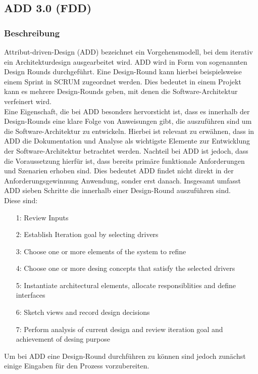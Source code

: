 \subsection{ADD 3.0 (FDD)}
\subsubsection{Beschreibung}
Attribut-driven-Design (ADD) bezeichnet ein Vorgehensmodell, bei dem iterativ ein Architekturdesign ausgearbeitet wird. ADD wird in Form von sogenannten Design Rounds durchgeführt. Eine Design-Round kann hierbei beispielsweise einem Sprint in SCRUM zugeordnet werden. Dies bedeutet in einem Projekt kann es mehrere Design-Rounds geben, mit denen die Software-Architektur verfeinert wird. \\

Eine Eigenschaft, die bei ADD besonders hervorsticht ist, dass es innerhalb der Design-Rounds eine klare Folge von Anweisungen gibt, die auszuführen sind um die Software-Architektur zu entwickeln. Hierbei ist relevant zu erwähnen, dass in ADD die Dokumentation und Analyse als wichtigste Elemente zur Entwicklung der Software-Architektur betrachtet werden. Nachteil bei ADD ist jedoch, dass die Voraussetzung hierfür ist, dass bereits primäre funktionale Anforderungen und Szenarien erhoben sind. Dies bedeutet ADD findet nicht direkt in der Anforderungsgewinnung Anwendung, sonder erst danach. Insgesamt umfasst ADD sieben Schritte die innerhalb einer Design-Round auszuführen sind.\\

Diese sind:
\begin{itemize}
\item[1:] Review Inputs
\item[2:] Establish Iteration goal by selecting drivers
\item[3:] Choose one or more elements of the system to refine
\item[4:] Choose one or more desing concepts that satisfy the selected drivers
\item[5:] Instantiate architectural elements, allocate responsiblities and define interfaces
\item[6:] Sketch views and record design decisions
\item[7:] Perform analysis of current design and review iteration goal and achievement of desing purpose
\end{itemize}
Um bei ADD eine Design-Round durchführen zu können sind jedoch zunächst einige Eingaben für den Prozess vorzubereiten.\\

